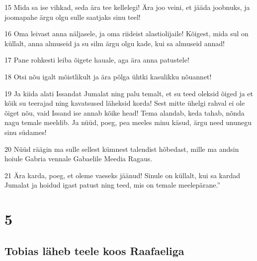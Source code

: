 \par 15 Mida sa ise vihkad, seda ära tee kellelegi! Ära joo veini,  et jääda joobnuks, ja joomapahe ärgu olgu sulle saatjaks sinu teel!
\par 16 Oma leivast anna näljasele, ja oma riideist alastiolijaile!  Kõigest, mida sul on küllalt, anna almuseid ja su silm ärgu olgu  kade, kui sa almuseid annad!
\par 17 Pane rohkesti leiba õigete hauale, aga ära anna patustele!
\par 18 Otsi nõu igalt mõistlikult ja ära põlga ühtki kasulikku nõuannet!
\par 19 Ja kiida alati Issandat Jumalat ning palu temalt, et su teed  oleksid õiged ja et kõik su teerajad ning kavatsused läheksid korda!  Sest mitte ühelgi rahval ei ole õiget nõu, vaid Issand ise annab kõike  head! Tema alandab, keda tahab, nõnda nagu temale meeldib. Ja nüüd,  poeg, pea meeles minu käsud, ärgu need ununegu sinu südames!
\par 20 Nüüd räägin ma sulle sellest kümnest talendist hõbedast,  mille ma andsin hoiule Gabria vennale Gabaelile Meedia Ragaus.
\par 21 Ära karda, poeg, et oleme vaeseks jäänud! Sinule on küllalt, kui  sa kardad Jumalat ja hoidud igast patust ning teed, mis on temale  meelepärane.”

\chapter{5}

\section*{Tobias läheb teele koos Raafaeliga}

